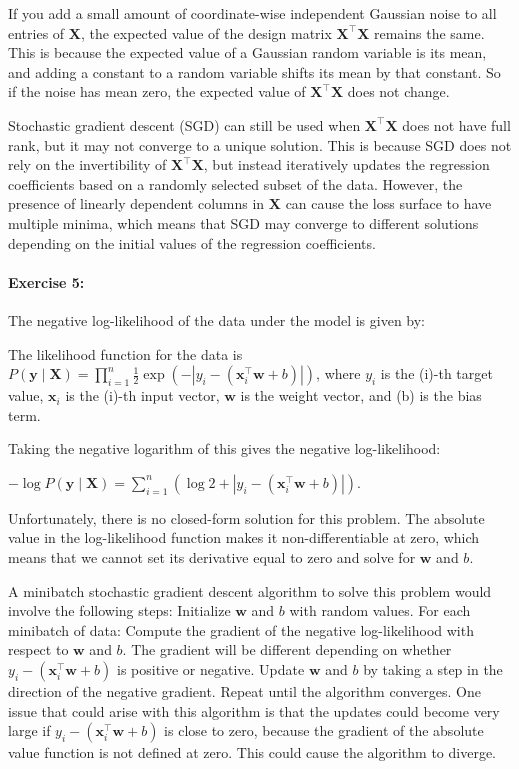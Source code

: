 If you add a small amount of coordinate-wise independent Gaussian noise to all entries of \(\mathbf{X}\), the expected value of the design matrix \(\mathbf{X}^\top \mathbf{X}\) remains the same.
This is because the expected value of a Gaussian random variable is its mean, and adding a constant to a random variable shifts its mean by that constant. So if the noise has mean zero, the expected value of \(\mathbf{X}^\top \mathbf{X}\) does not change.

Stochastic gradient descent (SGD) can still be used when \(\mathbf{X}^\top \mathbf{X}\) does not have full rank, but it may not converge to a unique solution.
This is because SGD does not rely on the invertibility of \(\mathbf{X}^\top \mathbf{X}\), but instead iteratively updates the regression coefficients based on a randomly selected subset of the data.
However, the presence of linearly dependent columns in \(\mathbf{X}\) can cause the loss surface to have multiple minima, which means that SGD may converge to different solutions depending on the initial values of the regression coefficients.


\paragraph{Exercise 5:}

The negative log-likelihood of the data under the model is given by:

The likelihood function for the data is \(P(\mathbf y \mid \mathbf X) = \prod_{i=1}^{n} \frac{1}{2} \exp(-|y_i - (\mathbf x_i^\top \mathbf w + b)|)\), where \(y_i\) is the (i)-th target value, \(\mathbf x_i\) is the (i)-th input vector, \(\mathbf w\) is the weight vector, and (b) is the bias term.

Taking the negative logarithm of this gives the negative log-likelihood:

\(-\log P(\mathbf y \mid \mathbf X) = \sum_{i=1}^{n} \left( \log 2 + |y_i - (\mathbf x_i^\top \mathbf w + b)| \right)\).

Unfortunately, there is no closed-form solution for this problem.
The absolute value in the log-likelihood function makes it non-differentiable at zero, which means that we cannot set its derivative equal to zero and solve for \(\mathbf w\) and \(b\).

A minibatch stochastic gradient descent algorithm to solve this problem would involve the following steps:
Initialize \(\mathbf w\) and \(b\) with random values.
For each minibatch of data:
Compute the gradient of the negative log-likelihood with respect to \(\mathbf w\) and \(b\).
The gradient will be different depending on whether \(y_i - (\mathbf x_i^\top \mathbf w + b)\) is positive or negative.
Update \(\mathbf w\) and \(b\) by taking a step in the direction of the negative gradient.
Repeat until the algorithm converges.
One issue that could arise with this algorithm is that the updates could become very large if \(y_i - (\mathbf x_i^\top \mathbf w + b)\) is close to zero, because the gradient of the absolute value function is not defined at zero. This could cause the algorithm to diverge.


